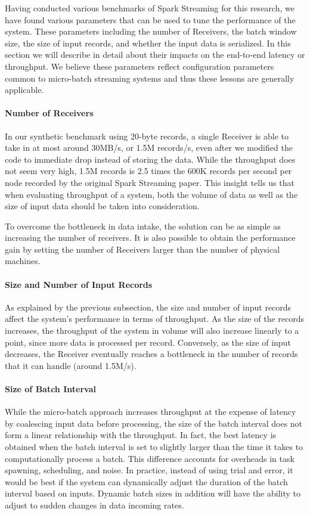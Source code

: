 Having conducted various benchmarks of Spark Streaming for this research, we have found various parameters that can be used to tune the performance of the system. These parameters including the number of Receivers, the batch window size, the size of input records, and whether the input data is serialized. In this section we will describe in detail about their impacts on the end-to-end latency or throughput. We believe these parameters reflect configuration parameters common to micro-batch streaming systems and thus these lessons are generally applicable.

\paragraph{Number of Receivers}
In our synthetic benchmark using 20-byte records, a single Receiver is able to take in at most around 30MB/s, or 1.5M records/s, even after we modified the code to immediate drop instead of storing the data. While the throughput does not seem very high, 1.5M records is 2.5 times the 600K records per second per node recorded by the original Spark Streaming paper. This insight tells us that when evaluating throughput of a system, both the volume of data as well as the size of input data should be taken into consideration.

To overcome the bottleneck in data intake, the solution can be as simple as increasing the number of receivers. It is also possible to obtain the performance gain by setting the number of Receivers larger than the number of physical machines.

\paragraph{Size and Number of Input Records}
As explained by the previous subsection, the size and number of input records affect the system's performance in terms of throughput. As the size of the records increases, the throughput of the system in volume will also increase linearly to a point, since more data is processed per record. Conversely, as the size of input decreases, the Receiver eventually reaches a bottleneck in the number of records that it can handle (around 1.5M/s).

\paragraph{Size of Batch Interval}
While the micro-batch approach increases throughput at the expense of latency by coalescing input data before processing, the size of the batch interval does not form a linear relationship with the throughput. In fact, the best latency is obtained when the batch interval is set to slightly larger than the time it takes to computationally process a batch. This difference accounts for overheads in task spawning, scheduling, and noise. In practice, instead of using trial and error, it would be best if the system can dynamically adjust the duration of the batch interval based on inputs. Dynamic batch sizes in addition will have the ability to adjust to sudden changes in data incoming rates.

